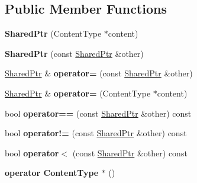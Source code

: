 \subsection*{Public Member Functions}
\begin{DoxyCompactItemize}
\item 
\hypertarget{classutilspp_1_1SharedPtr_a81ae404503660f8b5f8f417f33f842e4}{{\bfseries Shared\-Ptr} (Content\-Type $\ast$content)}\label{classutilspp_1_1SharedPtr_a81ae404503660f8b5f8f417f33f842e4}

\item 
\hypertarget{classutilspp_1_1SharedPtr_aa5964470c2f7b95e42f27698b09cd0bb}{{\bfseries Shared\-Ptr} (const \hyperlink{classutilspp_1_1SharedPtr}{Shared\-Ptr} \&other)}\label{classutilspp_1_1SharedPtr_aa5964470c2f7b95e42f27698b09cd0bb}

\item 
\hypertarget{classutilspp_1_1SharedPtr_aba08ed56dc5cb031778cc5378fee8c0d}{\hyperlink{classutilspp_1_1SharedPtr}{Shared\-Ptr} \& {\bfseries operator=} (const \hyperlink{classutilspp_1_1SharedPtr}{Shared\-Ptr} \&other)}\label{classutilspp_1_1SharedPtr_aba08ed56dc5cb031778cc5378fee8c0d}

\item 
\hypertarget{classutilspp_1_1SharedPtr_a4034da9ad0129341562d8c95b1ee7077}{\hyperlink{classutilspp_1_1SharedPtr}{Shared\-Ptr} \& {\bfseries operator=} (Content\-Type $\ast$content)}\label{classutilspp_1_1SharedPtr_a4034da9ad0129341562d8c95b1ee7077}

\item 
\hypertarget{classutilspp_1_1SharedPtr_a7b99f8eb353193b842d72c1e65eba67e}{bool {\bfseries operator==} (const \hyperlink{classutilspp_1_1SharedPtr}{Shared\-Ptr} \&other) const }\label{classutilspp_1_1SharedPtr_a7b99f8eb353193b842d72c1e65eba67e}

\item 
\hypertarget{classutilspp_1_1SharedPtr_a461d0a7494fa6459b9a735d10d949b4b}{bool {\bfseries operator!=} (const \hyperlink{classutilspp_1_1SharedPtr}{Shared\-Ptr} \&other) const }\label{classutilspp_1_1SharedPtr_a461d0a7494fa6459b9a735d10d949b4b}

\item 
\hypertarget{classutilspp_1_1SharedPtr_a7283f6ccd274e39d8852a3e3f599fb6d}{bool {\bfseries operator$<$} (const \hyperlink{classutilspp_1_1SharedPtr}{Shared\-Ptr} \&other) const }\label{classutilspp_1_1SharedPtr_a7283f6ccd274e39d8852a3e3f599fb6d}

\item 
\hypertarget{classutilspp_1_1SharedPtr_abfe426edb55403dc25c8405dc6a6dad8}{{\bfseries operator Content\-Type $\ast$} ()}\label{classutilspp_1_1SharedPtr_abfe426edb55403dc25c8405dc6a6dad8}


\end{DoxyCompactItemize}
